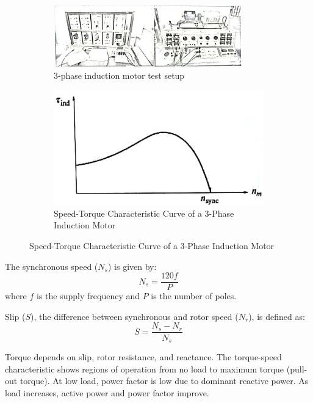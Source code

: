 \documentclass[a4paper,12pt]{article}
\begin{document}
	
		\begin{figure}[H]
		\centering
		\begin{subfigure}[t]{1\textwidth}
			\centering
			\includegraphics[width=0.9\textwidth]{Images/1}
			\caption{3-phase induction motor test setup}
			\vspace{0.1cm}
		\end{subfigure}
		
		\begin{subfigure}[t]{0.6\textwidth}
			\centering
			\includegraphics[width=1\textwidth]{Images/2}
			\caption{Speed-Torque Characteristic Curve of a 3-Phase Induction Motor}
		\end{subfigure}
	\end{figure}
	The synchronous speed ($N_s$) is given by:
	\[
	N_s = \frac{120f}{P}
	\]
	where $f$ is the supply frequency and $P$ is the number of poles.
	
	Slip ($S$), the difference between synchronous and rotor speed ($N_r$), is defined as:
	\[
	S = \frac{N_s - N_r}{N_s}
	\]
	
	Torque depends on slip, rotor resistance, and reactance. The torque-speed characteristic shows regions of operation from no load to maximum torque (pull-out torque). At low load, power factor is low due to dominant reactive power. As load increases, active power and power factor improve.
	
\end{document}
